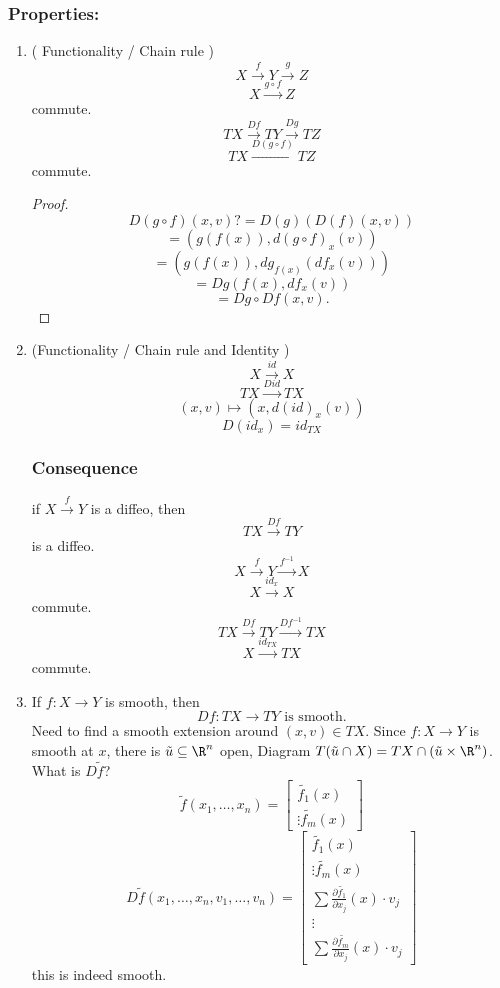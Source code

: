 \subsubsection*{Properties:}
\begin{enumerate}[(1)]
  \item ( Functionality / Chain rule )
    $$X \xrightarrow{ f}Y \xrightarrow{ g} Z$$
    $$X \xrightarrow{g\circ f} Z$$
    commute.
    $$TX \xrightarrow{ Df} TY \xrightarrow{ Dg}TZ$$
    $$TX \xrightarrow{D(g\circ f)} TZ$$
    commute.
      \begin{proof}
        $$D(g\circ f)(x,v) ?= D(g)\left(D(f)(x,v)\right)$$
        $$= \left(g(f(x)), d(g\circ f)_x(v)\right)$$
        $$= \left(g(f(x)), dg_{f(x)}(df_x(v))\right)$$
        $$= Dg \left(f(x), df_x(v)\right)$$
        $$= Dg \circ Df \left(x,v\right).$$
      \end{proof}
  \item (Functionality / Chain rule and Identity )
    $$X\xrightarrow{id}X$$
    $$TX \xrightarrow{Did}TX$$
    $$(x,v)\mapsto (x,d(id)_x(v))$$
    $$D(id_x)=id_{TX}$$
\subsubsection*{Consequence}
if $X\xrightarrow{f}Y$ is a diffeo, then
  $$TX \xrightarrow{Df}TY$$
is a diffeo.
  $$X \xrightarrow{f}Y \xrightarrow{f^{-1}}X$$
  $$X \xrightarrow{ id_x } X$$
  commute.
  $$TX \xrightarrow{ Df }TY \xrightarrow{Df^{-1}}TX$$
  $$X\xrightarrow{id_{TX}}TX$$
  commute.
  \item If $f: X \to Y$ is smooth, then
    $$Df: TX \to TY \text{ is smooth}.$$
    Need to find a smooth extension around $(x,v)\in TX$.
    \newline Since $f: X \to Y$ is smooth at $x$, there is $\tilde{u}\subseteq \R^n $
 open,
 \newline Diagram
\newline $T(\tilde{u}\cap X) = TX \cap (\tilde{u}\times \R^n)$.
\newline What is $D\tilde{f}$?
  $$ \tilde{f}(x_1,\dots ,x_n) =
    \begin{bmatrix}
      \tilde{f_1}(x) \\
      \vdots
      \tilde{f_m}(x)
    \end{bmatrix}
  $$
  $$ D\tilde{f}(x_1, \dots, x_n, v_1, \dots, v_n) =
    \begin{bmatrix}
      \tilde{f_1}(x) \\
      \vdots
      \tilde{f_m}(x) \\
    \sum \frac{\partial \tilde{f_1}}{\partial x_j}(x) \cdot v_j \\
    \vdots \\
  \sum \frac{\partial \tilde{f_m}}{\partial x_j}(x) \cdot v_j
    \end{bmatrix}
  $$
  this is indeed smooth.
  \end{enumerate}
